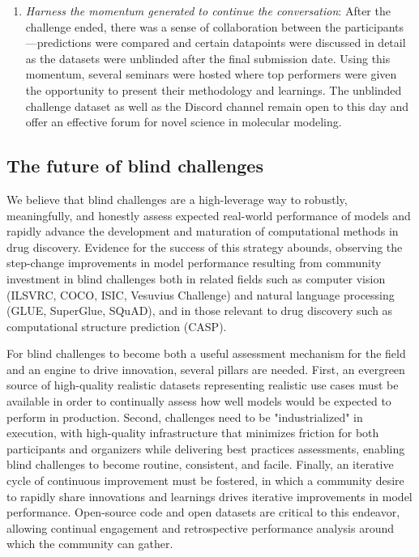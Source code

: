 \documentclass[journal=jcim,manuscript=article]{achemso}
\begin{document}
\begin{enumerate}
    \item \textit{Harness the momentum generated to continue the conversation}: After the challenge ended, there was a sense of collaboration between the participants---predictions were compared and certain datapoints were discussed in detail as the datasets were unblinded after the final submission date. Using this momentum, several seminars were hosted where top performers were given the opportunity to present their methodology and learnings. The unblinded challenge dataset as well as the Discord channel remain open to this day and offer an effective forum for novel science in molecular modeling.
\end{enumerate}


\subsection{The future of blind challenges}

We believe that blind challenges are a high-leverage way to robustly, meaningfully, and honestly assess expected real-world performance of models and rapidly advance the development and maturation of computational methods in drug discovery. 
Evidence for the success of this strategy abounds, observing the step-change improvements in model performance resulting from community investment in blind challenges both in related fields such as computer vision (ILSVRC\cite{ILSVRC15}, COCO\cite{coco}, ISIC\cite{tschandl_humancomputer_2020}, Vesuvius Challenge\cite{vesuvius}) and natural language processing (GLUE\cite{wang2019gluemultitaskbenchmarkanalysis}, SuperGlue\cite{sarlin2020supergluelearningfeaturematching},  SQuAD\cite{rajpurkar2016squad100000questionsmachine}), and in those relevant to drug discovery such as computational structure prediction (CASP)\cite{casp13_2019, casp14_2021, casp15_2023}. 

For blind challenges to become both a useful assessment mechanism for the field and an engine to drive innovation, several pillars are needed. 
First, an evergreen source of high-quality realistic datasets representing realistic use cases must be available in order to continually assess how well models would be expected to perform in production. 
Second, challenges need to be "industrialized" in execution, with high-quality infrastructure that minimizes friction for both participants and organizers while delivering best practices assessments, enabling blind challenges to become routine, consistent, and facile. 
Finally, an iterative cycle of continuous improvement must be fostered, in which a community desire to rapidly share innovations and learnings drives iterative improvements in model performance. 
Open-source code and open datasets are critical to this endeavor, allowing continual engagement and retrospective performance analysis around which the community can gather. 
\end{document}
